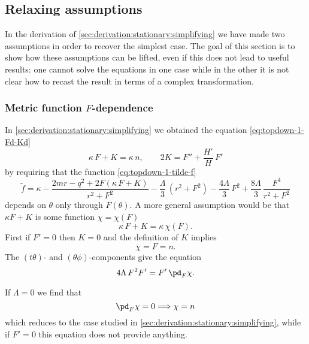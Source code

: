 \subsection{Relaxing assumptions}
\label{sec:derivation:relaxing}


In the derivation of \cref{sec:derivation:stationary:simplifying} we have made two assumptions in order to recover the simplest case.
The goal of this section is to show how these assumptions can be lifted, even if this does not lead to useful results: one cannot solve the equations in one case while in the other it is not clear how to recast the result in terms of a complex transformation.


\subsubsection{Metric function \texorpdfstring{$F$}{F}-dependence}
\label{sec:derivation:relaxing:metric-function}


In \cref{sec:derivation:stationary:simplifying} we obtained the equation \eqref{eq:topdown-1-Fd-Kd}
\begin{equation}
	\kappa\, F + K = \kappa\, n, \qquad
	2 K = F'' + \frac{H'}{H}\, F'
\end{equation}
by requiring that the function \eqref{eq:topdown-1-tilde-f}
\begin{equation}
	\tilde f = \kappa - \frac{2m r - q^2 + 2 F (\kappa\, F + K)}{r^2 + F^2} - \frac{\Lambda}{3}\, (r^2 + F^2) - \frac{4 \Lambda}{3}\, F^2 + \frac{8 \Lambda}{3}\, \frac{F^4}{r^2 + F^2}
\end{equation} 
depends on $\theta$ only through $F(\theta)$.
A more general assumption would be that $\kappa F + K$ is some function $\chi = \chi(F)$
\begin{equation}
	\label{eq:topdown-1-Fd-Kd-chi}
	\kappa\, F + K = \kappa\, \chi(F).
\end{equation} 
First if $F' = 0$ then $K = 0$ and the definition of $K$ implies
\begin{equation}
	\chi = F = n.
\end{equation} 
The $(t\theta)$- and $(\theta\phi)$-components give the equation
\begin{equation}
	4 \Lambda\, F^2 F' = F'\, \pd_F \chi.
\end{equation} 

If $\Lambda = 0$ we find that
\begin{equation}
	\pd_F \chi = 0
	\Longrightarrow
	\chi = n
\end{equation} 
which reduces to the case studied in \cref{sec:derivation:stationary:simplifying}, while if $F' = 0$ this equation does not provide anything.

